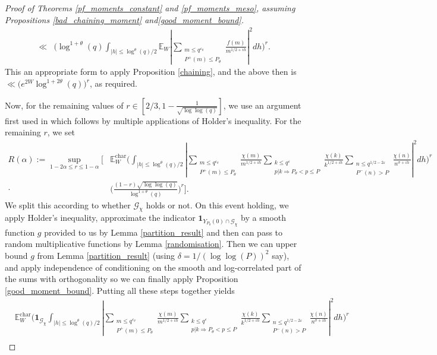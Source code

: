 \documentclass[10pt,a4paper]{amsart}
\numberwithin{equation}{section}
\begin{document}
\begin{proof}[Proof of Theorems \ref{pf_moments_constant} and \ref{pf_moments_meso}, assuming Propositions \ref{bad_chaining_moment} and\ref{good_moment_bound}]
\begin{align*}
        \ll& \big(\log^{1+\theta}(q)\int_{|h| \leq \log^\theta(q)/2}\mathbb{E}_W|\sum_{\substack{m \leq q^{\varepsilon_\theta} \\ P^+(m) \leq P_\theta}}\frac{f(m)}{m^{1/2+ih}}|^2dh\big)^r. 
    \end{align*}
    This an appropriate form to apply Proposition \ref{chaining}, and the above then is
    $\ll\bigg(e^{2W}\log^{1+2\theta}(q)\bigg)^r$,
    as required.\par
    Now, for the remaining values of $r \in [2/3,1-\frac{1}{\sqrt{\log\log(q)}}]$, we use an argument first used in \cite{aharper201} which follows by multiple applications of Holder's inequality. For the remaining $r$, we set
    \begin{align*}
        R(\alpha) := \sup_{1-2\alpha \leq r \leq 1-\alpha}\bigg[&\mathbb{E}_W^{\text{char}}\big(\int_{|h|\leq \log^\theta(q)/2}|\sum_{\substack{m \leq q^{\varepsilon_\theta} \\ P^+(m) \leq P_\theta}}\frac{\chi(m)}{m^{1/2+ih}}\sum_{\substack{k \leq q^{\varepsilon} \\ p|k \Rightarrow P_\theta < p \leq P}}\frac{\chi(k)}{k^{1/2+ih}}\sum_{\substack{n \leq q^{1/2-2\varepsilon} \\ P^{-}(n) > P}}\frac{\chi(n)}{n^{\sigma+ih}}|^2dh\big)^r \\
        \cdot& \big(\frac{(1-r)\sqrt{\log\log(q)}}{\log^{1+\theta}(q)}\big)^r\bigg].
    \end{align*}
    We split this according to whether $\mathcal{G}_\chi$ holds or not. On this event holding, we apply Holder's inequality, approximate the indicator $\mathbf{1}_{Y_{P_\theta}(0) \cap \mathcal{G}_\chi}$ by a smooth function $g$ provided to us by Lemma \ref{partition_result} and then can pass to random multiplicative functions by Lemma \ref{randomisation}. Then we can upper bound $g$ from Lemma \ref{partition_result} (using $\delta=1/(\log\log(P))^2$ say), and apply independence of conditioning on the smooth and log-correlated part of the sums with orthogonality so we can finally apply Proposition \ref{good_moment_bound}. Putting all these steps together yields
    \begin{align*}
        &\mathbb{E}_W^{\text{char}}\big(\mathbf{1}_{\mathcal{G}_\chi}\int_{|h|\leq \log^\theta(q)/2}|\sum_{\substack{m \leq q^{\varepsilon_\theta} \\ P^+(m) \leq P_\theta}}\frac{\chi(m)}{m^{1/2+ih}}\sum_{\substack{k \leq q^{\varepsilon} \\ p|k \Rightarrow P_\theta < p \leq P}}\frac{\chi(k)}{k^{1/2+ih}}\sum_{\substack{n \leq q^{1/2-2\varepsilon} \\ P^{-}(n) > P}}\frac{\chi(n)}{n^{\sigma+ih}}|^2dh\big)^r \\

\end{align*}
\end{proof}
\end{document}
